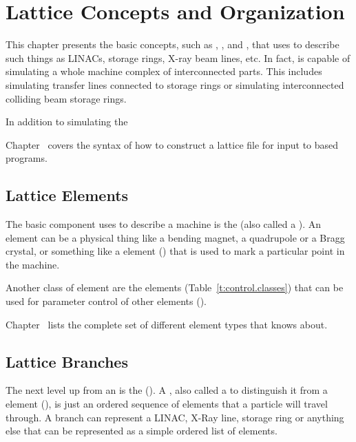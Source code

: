 \chapter{Lattice Concepts and Organization}
\label{c:lat.concepts}

This chapter presents the basic concepts, such as ,
, and , that \bmad uses to describe such things
as LINACs, storage rings, X-ray beam lines, etc.  In fact, \bmad is
capable of simulating a whole machine complex of interconnected parts.
This includes simulating transfer lines connected to storage rings or 
simulating interconnected colliding beam storage rings.

In addition to simulating the 

Chapter~ covers the syntax of how to construct a
lattice file for input to \bmad based programs.

\section{Lattice Elements}
\label{s:element.def}

The basic component \bmad uses to describe a machine is the
 (also called a ).  An element can be
a physical thing like a bending magnet, a quadrupole or a Bragg
crystal, or something like a  element ()
that is used to mark a particular point in the machine.

Another class of element are the  elements
(Table~\ref{t:control.classes}) that can be used for parameter control
of other elements ().

Chapter~ lists the complete set of different element
types that \bmad knows about.

\section{Lattice Branches}
\label{s:branch.def}

The next level up from an  is the 
().  A , also called a  to distinguish it from a  element
(), is just an ordered sequence of elements that a
particle will travel through. A branch can represent a LINAC, X-Ray
line, storage ring or anything else that can be represented as a
simple ordered list of elements. 

